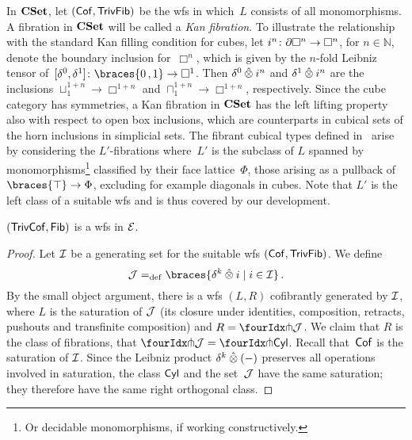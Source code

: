 \documentclass[reqno,10pt,a4paper,oneside,draft]{amsart}
\begin{document}
\begin{example} \label{nonalgebraic-cof}
In $\CSet$, let $(\Cof, \TrivFib)$ be the wfs in which~$L$ consists of all monomorphisms.
A fibration in $\CSet$ will be called a \emph{Kan fibration}.
To illustrate the relationship with the standard Kan filling condition for cubes, let $i^n \co \partial \Box^n \to \Box^n$, for $n \in \mathbb{N}$, denote the boundary inclusion for~$\Box^n$, which is given by the $n$-fold Leibniz tensor of~$[\lcyl, \rcyl] \co \braces{0\,, 1} \to \Box^1$.
Then $\lcyl \hatotimes i^n$ and $\rcyl \hatotimes i^n$ are the inclusions $\sqcup_1^{1+n} \to \Box^{1+n}$ and $\sqcap_1^{1+n} \to \Box^{1+n}$, respectively.
Since the cube category has symmetries, a Kan fibration in $\CSet$ has the left lifting property also with respect to open box inclusions, which are counterparts in cubical sets of the horn inclusions in simplicial sets.
The fibrant cubical types defined in~\cite{cohen-et-al:cubicaltt} arise by considering the $L'$-fibrations where~$L'$ is the subclass of $L$ spanned by monomorphisms\footnote{Or decidable monomorphisms, if working constructively.} classified by their face lattice~$\Phi$, \ie those arising as a pullback of $\braces{\top} \to \Phi$, excluding for example diagonals in cubes.
Note that $L'$ is the left class of a suitable wfs and is thus covered by our development.
\end{example}

\begin{proposition} \label{thm:wfstimes}
$(\TrivCof, \Fib)$ is a wfs in $\cal{E}$.
\end{proposition}

\begin{proof}
Let $\cal{I}$ be a generating set for the suitable wfs $(\Cof, \TrivFib)$.
We define
\[
\cal{J} \defeq \braces{\delta^k \hatotimes i \mid i \in \cal{I}}
\, .\]
By the small object argument, there is a wfs $(L, R)$ cofibrantly generated by $\cal{I}$, where $L$ is the saturation of $\cal{J}$ (\ie its closure under identities, composition, retracts, pushouts and transfinite composition) and $R = \liftr{\cal{J}}$.
We claim that $R$ is the class of fibrations, \ie that $\liftr{\cal{J}} = \liftr{\Cyl}$.
Recall that~$\Cof$ is the saturation of $\cal{I}$.
Since the Leibniz product $\kcyl \hatotimes (-)$ preserves all operations involved in saturation, the class $\Cyl$ and the set~$\cal{J}$ have the same saturation; they therefore have the same right orthogonal class.
\end{proof}
\end{document}
